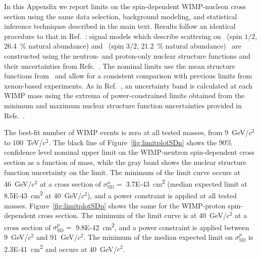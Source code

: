 In this Appendix we report limits on the spin-dependent WIMP-nucleon cross section using the same data selection, background modeling, and statistical inference techniques described in the main text. Results follow an identical procedure to that in Ref.~\cite{SR1WS}: signal models which describe scattering on \XeOneTwoNine\ (spin $1/2$, \SI{26.4}{\percent} natural abundance) and \XeOneThreeOne\ (spin $3/2$, \SI{21.2}{\percent} natural abundance)~\cite{XeAbundances} are constructed using the neutron- and proton-only nuclear structure functions and their uncertainties from Refs.~\cite{PhysRevD.102.074018,Pirinen:2019gap,PhysRevLett.128.072502}. The nominal limits use the mean structure functions from~\cite{PhysRevD.102.074018} and allow for a consistent comparison with previous limits from xenon-based experiments. As in Ref.~\cite{SR1WS}, an uncertainty band is calculated at each WIMP mass using the extrema of power-constrained limits obtained from the minimum and maximum nuclear structure function uncertainties provided in Refs.~\cite{PhysRevD.102.074018,Pirinen:2019gap,PhysRevLett.128.072502}.

The best-fit number of WIMP events is zero at all tested masses, from 9~GeV/$c^2$ to 100~TeV/$c^2$. The black line of Figure~\ref{fig:limitplotSDn} shows the 90\% confidence level nominal upper limit on the WIMP-neutron spin-dependent cross section as a function of mass, while the gray band shows the nuclear structure function uncertainty on the limit.  The minimum of the limit curve occurs at 46~GeV/$c^2$ at a cross section of $\sigma_{\mathrm{SD}}^{n} =$ \SI{3.7E-43}{cm\squared} (median expected limit at \SI{8.5E-43}{cm\squared} at 40~GeV/$c^2$), and a power constraint is applied at all tested masses. Figure~\ref{fig:limitplotSDp} shows the same for the WIMP-proton spin-dependent cross section. The minimum of the limit curve is at 40~GeV/$c^2$ at a cross section of $\sigma_{\mathrm{SD}}^p =$ \SI{9.8E-42}{cm\squared}, and a power constraint is applied between 9~GeV/$c^2$ and 91~GeV/$c^2$. The minimum of the median expected limit on $\sigma_{\mathrm{SD}}^p$ is \SI{2.3E-41}{cm\squared} and occurs at 40~GeV/$c^2$.
